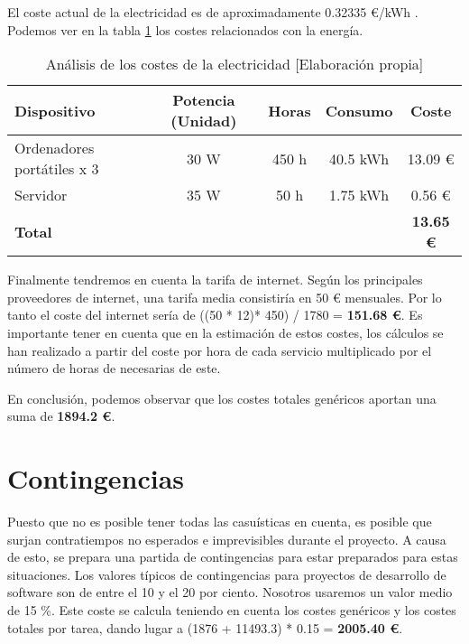 El coste actual de la electricidad es de aproximadamente 0.32335 €/kWh \cite{precioLuz}. Podemos ver en la tabla \ref{tab:energia} los costes relacionados con la energía.

\begin{table}[h]
    \begin{center}
        \begin{tabular}{ l  c  c  c  c }
        \textbf{Dispositivo} & \textbf{Potencia (Unidad)} & \textbf{Horas} & \textbf{Consumo} & \textbf{Coste} \\
        \hline
        Ordenadores portátiles x 3 & 30 W & 450 h & 40.5 kWh & 13.09 € \\
        Servidor & 35 W & 50 h & 1.75 kWh & 0.56 € \\
        \hline
        \textbf{Total} & & & & \textbf{13.65 €} \\
        \end{tabular}
        \caption{Análisis de los costes de la electricidad [Elaboración propia]}
        \label{tab:energia}
    \end{center}
\end{table}

Finalmente tendremos en cuenta la tarifa de internet. Según los principales proveedores de internet, una tarifa media consistiría en 50 € mensuales. Por lo tanto el coste del internet sería de ((50 * 12)* 450) / 1780 = \textbf{151.68 €}. Es importante tener en cuenta que en la estimación de estos costes, los cálculos se han realizado a partir del coste por hora de cada servicio multiplicado por el número de horas de necesarias de este.

En conclusión, podemos observar que los costes totales genéricos aportan una suma de \textbf{1894.2 €}.

\section{Contingencias}

Puesto que no es posible tener todas las casuísticas en cuenta, es posible que surjan contratiempos no esperados e imprevisibles durante el proyecto. A causa de esto, se prepara una partida de contingencias para estar preparados para estas situaciones. Los valores típicos de contingencias para proyectos de desarrollo de software son de entre el 10 y el 20 por ciento. Nosotros usaremos un valor medio de 15 \%. Este coste se calcula teniendo en cuenta los costes genéricos y los costes totales por tarea, dando lugar a (1876 + 11493.3) * 0.15 = \textbf{2005.40 €}.

